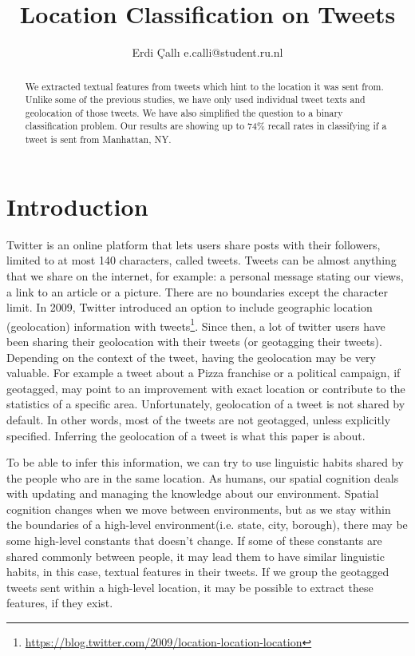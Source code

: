 \documentclass[twoside,11pt]{article}
\begin{document}
\title{Location Classification on Tweets}
\author{\name Erdi \c{C}all{\i}  \email e.calli@student.ru.nl}
\maketitle
\begin{abstract}

We extracted textual features from tweets which hint to the location it was sent from. Unlike some of the previous studies, we have only used individual tweet texts and geolocation of those tweets. We have also simplified the question to a binary classification problem. Our results are showing up to 74\% recall rates in classifying if a tweet is sent from Manhattan, NY.

\end{abstract}


\section{Introduction}

Twitter is an online platform that lets users share posts with their followers, limited to at most 140 characters, called tweets. Tweets can be almost anything that we share on the internet, for example: a personal message stating our views, a link to an article or a picture. There are no boundaries except the character limit. In 2009, Twitter introduced an option to include geographic location (geolocation) information with tweets\footnote{\url{https://blog.twitter.com/2009/location-location-location}}. Since then, a lot of twitter users have been sharing their geolocation with their tweets (or geotagging their tweets). Depending on the context of the tweet, having the geolocation may be very valuable. For example a tweet about a Pizza franchise or a political campaign, if geotagged, may point to an improvement with exact location or contribute to the statistics of a specific area. Unfortunately, geolocation of a tweet is not shared by default. In other words, most of the tweets are not geotagged, unless explicitly specified. Inferring the geolocation of a tweet is what this paper is about.

To be able to infer this information, we can try to use linguistic habits shared by the people who are in the same location. As humans, our spatial cognition deals with updating and managing the knowledge about our environment. Spatial cognition changes when we move between environments, but as we stay within the boundaries of a high-level environment(i.e. state, city, borough), there may be some high-level constants that doesn't change. If some of these constants are shared commonly between people, it may lead them to have similar linguistic habits, in this case, textual features in their tweets. If we group the geotagged tweets sent within a high-level location, it may be possible to extract these features, if they exist.
\end{document}
